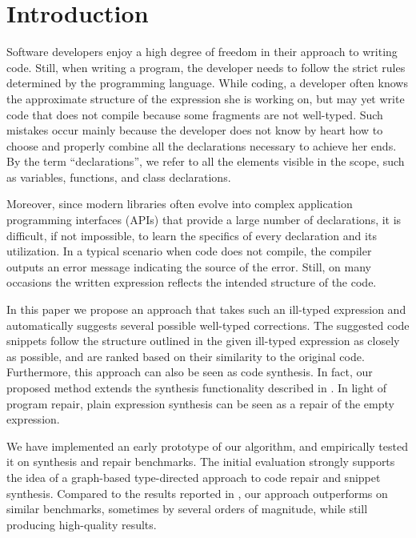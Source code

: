 \section{Introduction}
\label{sec:intro}
Software developers enjoy a high degree of freedom in their approach to writing code. Still, when writing a program, the developer needs to follow the strict rules determined by the programming language. While coding, a developer often knows the approximate structure of the expression she is working on, but may yet write code that does not compile because some fragments are not well-typed. Such mistakes occur mainly because the developer does not know by heart how to choose and properly combine all the declarations necessary to achieve her ends. By the term ``declarations'', we refer to all the elements visible in the scope, such as variables, functions, and class declarations.

Moreover, since modern libraries often evolve into complex application programming interfaces (APIs) that provide a large number of declarations, it is difficult, if not impossible, to learn the specifics of every declaration and its utilization. In a typical scenario when code does not compile, the compiler outputs an error message indicating the source of the error. Still, on many occasions the written expression reflects the intended structure of the code.

In this paper we propose an approach that takes such an ill-typed expression and automatically suggests several possible well-typed corrections. The suggested code snippets follow the structure outlined in the given ill-typed expression as closely as possible, and are ranked based on their similarity to the original code. Furthermore, this approach can also be seen as code synthesis. In fact, our proposed method extends the synthesis functionality described in \cite{MandelinetALL2005Jungloid, GveroETAL13CompleteCompletionTypesWeights, PerelmanGBG12}. In light of program repair, plain expression synthesis can be seen as a repair of the empty expression.


We have implemented an early prototype of our algorithm, and empirically tested it on synthesis and repair benchmarks. The initial evaluation strongly supports the idea of a graph-based type-directed approach to code repair and snippet synthesis. Compared to the results reported in \cite{GveroETAL13CompleteCompletionTypesWeights}, our approach outperforms on similar benchmarks, sometimes by several orders of magnitude, while still producing high-quality results.
